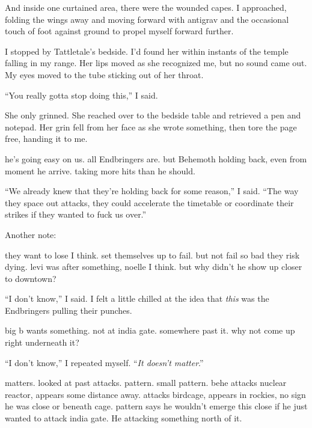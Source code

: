 And inside one curtained area, there were the wounded capes.  I approached, folding the wings away and moving forward with antigrav and the occasional touch of foot against ground to propel myself forward further.



I stopped by Tattletale's bedside.  I'd found her within instants of the temple falling in my range.  Her lips moved as she recognized me, but no sound came out.  My eyes moved to the tube sticking out of her throat.



``You really gotta stop doing this,'' I said.



She only grinned.  She reached over to the bedside table and retrieved a pen and notepad.  Her grin fell from her face as she wrote something, then tore the page free, handing it to me.



he's going easy on us.  all Endbringers are.  but Behemoth holding back, even from moment he arrive.  taking more hits than he should.



``We already knew that they're holding back for some reason,'' I said.  ``The way they space out attacks, they could accelerate the timetable or coordinate their strikes if they wanted to fuck us over.''



Another note:



they want to lose I think.  set themselves up to fail.  but not fail so bad they risk dying.  levi was after something, noelle I think.  but why didn't he show up closer to downtown?



``I don't know,'' I said.  I felt a little chilled at the idea that \emph{this }was the Endbringers pulling their punches.



big b wants something.  not at india gate.  somewhere past it.  why not come up right underneath it?



``I don't know,'' I repeated myself.  ``\emph{It doesn't matter}.''



matters.  looked at past attacks.  pattern.  small pattern.  behe attacks nuclear reactor, appears some distance away.  attacks birdcage, appears in rockies, no sign he was close or beneath cage.  pattern says he wouldn't emerge this close if he just wanted to attack india gate.  He attacking something north of it.



